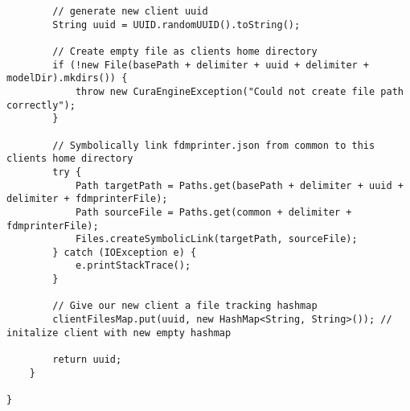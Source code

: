 \begin{lstlisting}
        // generate new client uuid
        String uuid = UUID.randomUUID().toString();

        // Create empty file as clients home directory
        if (!new File(basePath + delimiter + uuid + delimiter + modelDir).mkdirs()) {
            throw new CuraEngineException("Could not create file path correctly");
        }

        // Symbolically link fdmprinter.json from common to this clients home directory
        try {
            Path targetPath = Paths.get(basePath + delimiter + uuid + delimiter + fdmprinterFile);
            Path sourceFile = Paths.get(common + delimiter + fdmprinterFile);
            Files.createSymbolicLink(targetPath, sourceFile);
        } catch (IOException e) {
            e.printStackTrace();
        }

        // Give our new client a file tracking hashmap
        clientFilesMap.put(uuid, new HashMap<String, String>()); // initalize client with new empty hashmap

        return uuid;
    }

}
\end{lstlisting}

